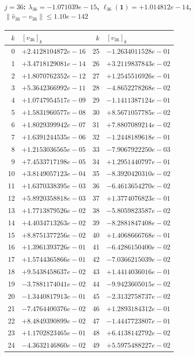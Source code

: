 \documentclass[11pt]{article}
\begin{document}
\paragraph{$j = 36$: $\lambda_{36} = -1.071039e-15$, \quad $\ell_{36}(\mathbf{1}) = +1.014812e-14$, \quad $\|\hat v_{36} - v_{36}\| \leq 1.10e-142$}
\begin{center}
{\footnotesize
\begin{tabular}{r@{\;\;}l@{\quad}r@{\;\;}l}
\toprule
$k$ & $[v_{36}]_k$ & $k$ & $[v_{36}]_k$ \\
\midrule
0 & $+2.4128104872e-16$ & 25 & $-1.2634011528e-01$ \\
1 & $+3.4718129081e-14$ & 26 & $+3.2119837843e-02$ \\
2 & $+1.8070762352e-12$ & 27 & $+1.2545516926e-01$ \\
3 & $+5.3642366992e-11$ & 28 & $-4.8652278268e-02$ \\
4 & $+1.0747954517e-09$ & 29 & $-1.1411387124e-01$ \\
5 & $+1.5831960577e-08$ & 30 & $+8.5671057785e-02$ \\
6 & $+1.8029399942e-07$ & 31 & $+7.8807089214e-02$ \\
7 & $+1.6391244535e-06$ & 32 & $-1.2448189618e-01$ \\
8 & $+1.2153036565e-05$ & 33 & $-7.9067922250e-03$ \\
9 & $+7.4533717198e-05$ & 34 & $+1.2951440797e-01$ \\
10 & $+3.8149057123e-04$ & 35 & $-8.3920420310e-02$ \\
11 & $+1.6370338395e-03$ & 36 & $-6.4613654270e-02$ \\
12 & $+5.8920358818e-03$ & 37 & $+1.3774076823e-01$ \\
13 & $+1.7713879526e-02$ & 38 & $-5.8059823587e-02$ \\
14 & $+4.4034713263e-02$ & 39 & $-8.2881847408e-02$ \\
15 & $+8.8751377256e-02$ & 40 & $+1.4068666768e-01$ \\
16 & $+1.3961393726e-01$ & 41 & $-6.4286150400e-02$ \\
17 & $+1.5744365866e-01$ & 42 & $-7.0366215039e-02$ \\
18 & $+9.5438458637e-02$ & 43 & $+1.4414036016e-01$ \\
19 & $-3.7881174041e-02$ & 44 & $-9.9423605015e-02$ \\
20 & $-1.3440817913e-01$ & 45 & $-2.3132758737e-02$ \\
21 & $-7.4764400376e-02$ & 46 & $+1.2893184312e-01$ \\
22 & $+8.4849390899e-02$ & 47 & $-1.4447723807e-01$ \\
23 & $+1.1702823465e-01$ & 48 & $+6.4138142792e-02$ \\
24 & $-4.3632146860e-02$ & 49 & $+5.5975488227e-02$ \\
\bottomrule
\end{tabular}
}
\end{center}
\end{document}

